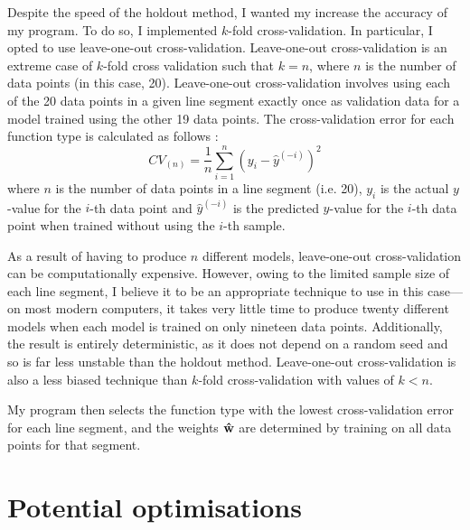 \documentclass[onecolumn, 12pt, a4paper]{article}
\begin{document}
Despite the speed of the holdout method, I wanted my increase the accuracy
of my program.
To do so, I implemented $k$-fold cross-validation.
In particular, I opted to use leave-one-out cross-validation.
Leave-one-out cross-validation is 
an extreme case of $k$-fold cross validation
such that $k = n$, where
$n$ is the number of data points (in this case, 20).
Leave-one-out cross-validation involves using each of
the 20 data points in a given line segment exactly once as validation data for a model
trained using the other 19 data points. 
The cross-validation error for each function type is calculated
as follows \cite{Stanford}:
\[
    CV_{(n)} = \frac{1}{n} \sum_{i = 1}^{n} (y_{i} - \hat{y}^{(-i)})^{2}
\]
where
$n$ is the number of data points in a line segment (i.e. 20),
$y_{i}$ is the actual $y$-value for the $i$-th data point
and $\hat{y}^{(-i)}$ is the predicted $y$-value for the $i$-th
data point when trained without using the $i$-th sample.

As a result of having to produce $n$ different models,
leave-one-out cross-validation can be computationally expensive.
However, owing to the limited sample size of each line segment,
I believe it to be an appropriate technique to use in this case---on
most modern computers, it takes very little time
to produce twenty different models when each model is trained
on only nineteen data points.
Additionally, the result is entirely deterministic, as it does not depend
on a random seed and so is far less unstable than the holdout method.
Leave-one-out cross-validation is also a less biased technique
than $k$-fold cross-validation with values of $k < n$.

My program then selects the function type with the lowest
cross-validation error for each line segment,
and the weights $\vb{\hat{w}}$ are determined by training on all
data points for that segment.

\section{Potential optimisations}

\end{document}
